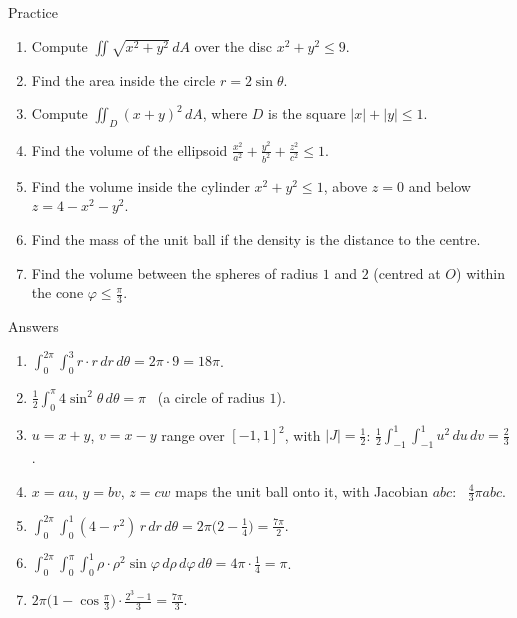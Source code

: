 \documentclass[10pt]{wosm-slides}
\newcommand{\dA}{\, dA}
\begin{document}
\begin{frame}{Practice}
  \small
  \begin{enumerate}
    \item Compute $\iint \sqrt{x^2 + y^2} \dA$ over the disc $x^2 + y^2 \le 9$.
    \item Find the area inside the circle $r = 2\sin\theta$.
    \item Compute $\iint_D (x + y)^2 \dA$, where $D$ is the square $|x| + |y| \le 1$.
    \item Find the volume of the ellipsoid $\frac{x^2}{a^2} + \frac{y^2}{b^2} + \frac{z^2}{c^2} \le 1$.
    \item Find the volume inside the cylinder $x^2 + y^2 \le 1$, above $z = 0$ and below
      $z = 4 - x^2 - y^2$.
    \item Find the mass of the unit ball if the density is the distance to the centre.
    \item Find the volume between the spheres of radius $1$ and $2$ (centred at $O$) within the cone
      $\varphi \le \frac\pi3$.
  \end{enumerate}
\end{frame}

\begin{frame}{Answers}
  \small
  \begin{enumerate}
    \item $\int_0^{2\pi} \int_0^3 r \cdot r\, dr\, d\theta = 2\pi \cdot 9 = 18\pi$.
    \item $\frac12 \int_0^\pi 4\sin^2\theta\, d\theta = \pi$ \ (a circle of radius $1$).
    \item $u = x + y$, $v = x - y$ range over $[-1, 1]^2$, with $|J| = \frac12$:
      $\frac12 \int_{-1}^1 \int_{-1}^1 u^2\, du\, dv = \frac23$.
    \item $x = au$, $y = bv$, $z = cw$ maps the unit ball onto it, with Jacobian $abc$: \ $\frac43 \pi abc$.
    \item $\int_0^{2\pi} \int_0^1 (4 - r^2)\, r\, dr\, d\theta = 2\pi\bigl(2 - \frac14\bigr) = \frac{7\pi}{2}$.
    \item $\int_0^{2\pi} \int_0^\pi \int_0^1 \rho \cdot \rho^2 \sin\varphi\, d\rho\, d\varphi\, d\theta = 4\pi \cdot \frac14 = \pi$.
    \item $2\pi \bigl(1 - \cos\frac\pi3\bigr) \cdot \frac{2^3 - 1}{3} = \frac{7\pi}{3}$.
  \end{enumerate}
\end{frame}
\end{document}
